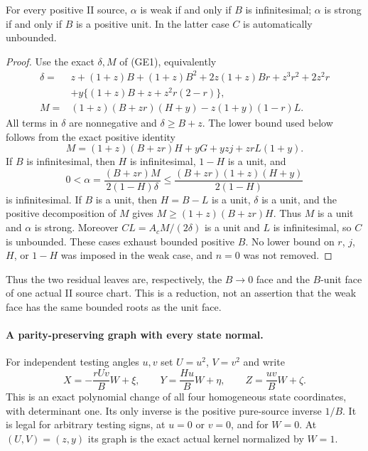 \begin{proposition}
For every positive II source, $\alpha$ is weak if and only if $B$ is
infinitesimal; $\alpha$ is strong if and only if $B$ is a positive
unit.  In the latter case $C$ is automatically unbounded.
\end{proposition}
\begin{proof}
Use the exact $\delta,M$ of (GE1), equivalently
\[
\begin{split}
 \delta={}&z+(1+z)B+(1+z)B^2+2z(1+z)Br+z^3r^2+2z^2r\\
 &+y\{(1+z)B+z+z^2r(2-r)\},\\
 M={}&(1+z)(B+zr)(H+y)-z(1+y)(1-r)L.
\end{split}
\]
All terms in $\delta$ are nonnegative and $\delta\ge B+z$.
The lower bound used below follows from the exact positive identity
\[
 M=(1+z)(B+zr)H+yG+yzj+zrL(1+y).
\]
If $B$ is infinitesimal, then $H$ is infinitesimal, $1-H$ is a unit,
and
\[
 0<\alpha=\frac{(B+zr)M}{2(1-H)\delta}
 \le\frac{(B+zr)(1+z)(H+y)}{2(1-H)}
\]
is infinitesimal.  If $B$ is a unit, then $H=B-L$ is a unit,
$\delta$ is a unit, and the positive decomposition of $M$ gives
$M\ge(1+z)(B+zr)H$.  Thus $M$ is a unit and $\alpha$ is strong.
Moreover $CL=A_cM/(2\delta)$ is a unit and $L$ is infinitesimal,
so $C$ is unbounded.  These cases exhaust bounded positive $B$.
No lower bound on $r$, $j$, $H$, or $1-H$ was imposed in the weak
case, and $n=0$ was not removed.
\end{proof}

Thus the two residual leaves are, respectively, the $B\to0$ face and
the $B$-unit face of one actual II source chart.  This is a reduction,
not an assertion that the weak face has the same bounded roots as the
unit face.

\paragraph{A parity-preserving graph with every state normal.}
For independent testing angles $u,v$ set $U=u^2$, $V=v^2$ and write
\[
 X=-\frac{rU v}{B}W+\xi,\qquad
 Y=\frac{Hu}{B}W+\eta,\qquad
 Z=\frac{uv}{B}W+\zeta.                         \tag{DI1}
\]
This is an exact polynomial change of all four homogeneous state
coordinates, with determinant one.  Its only inverse is the positive
pure-source inverse $1/B$.  It is legal for arbitrary testing signs,
at $u=0$ or $v=0$, and for $W=0$.  At $(U,V)=(z,y)$ its graph is the
exact actual kernel normalized by $W=1$.

